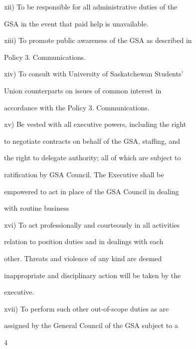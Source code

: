   

  

xii)     To  be  responsible  for  all  administrative  duties  of  the  

         GSA in the event that paid help is unavailable.   

  

xiii)    To promote public awareness of the GSA as described in  



         Policy 3. Communications.   

  

xiv)     To  consult  with  University  of  Saskatchewan  Students’  

         Union  counterparts  on  issues  of  common  interest  in  

         accordance with the Policy 3. Communications.   

  

xv)      Be vested with all executive powers, including the right  

         to negotiate contracts on behalf of the GSA, staffing, and  

         the right to delegate authority; all of which are subject to  

         ratification  by  GSA  Council.  The  Executive  shall  be  

         empowered to act in place of the GSA Council in dealing  

         with routine business   

  

xvi)     To  act  professionally  and  courteously  in  all  activities  

         relation  to  position  duties  and  in  dealings  with  each  

         other.  Threats  and  violence  of  any  kind  are  deemed  

         inappropriate and disciplinary action will be taken by the  

         executive.   

  

xvii)   To      perform       such     other     out-of-scope         duties     as    are  

         assigned by the General Council of the GSA subject to a  



                                        4  

                            

